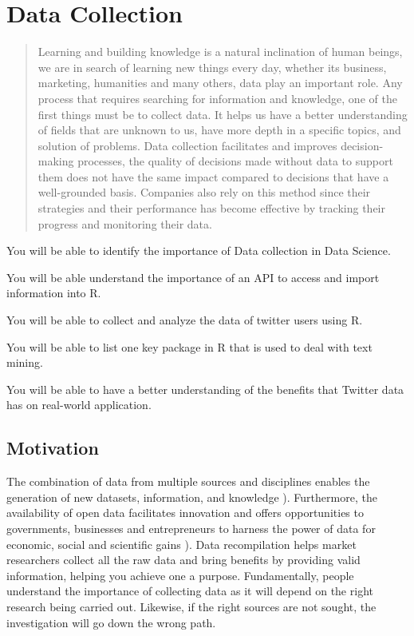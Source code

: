 \chapter{Data Collection}\label{ch:data collection}


\begin{abstract}
	Learning and building knowledge is a natural inclination of human beings, we are in search of learning new things every day, whether its business, marketing, humanities and many others, data play an important role. Any process that requires searching for information and knowledge, one of the first things must be to collect data. It helps us have a better understanding of fields that are unknown to us, have more depth in a specific topics, and solution of problems. Data collection facilitates and improves decision-making processes, the quality of decisions made without data to support them does not have the same impact compared to decisions that have a well-grounded basis. Companies also rely on this method since their strategies and their performance has become effective by tracking their progress and monitoring their data. 
\end{abstract}

\begin{goals}
	\item You will be able to identify the importance of Data collection in Data Science.
	\item You will be able understand the importance of an API to access and import information into R.
	\item You will be able to collect and analyze the data of twitter users using R.
	\item You will be able to list one key package in R that is used to deal with text mining.
	\item You will be able to have a better understanding of the benefits that Twitter data has on real-world application. 
	
\end{goals}

\section{Motivation}
The combination of data from multiple sources and disciplines enables the generation of new datasets, information, and knowledge \citep{JAEGER2010371}). Furthermore, the availability of open data facilitates innovation and offers opportunities to governments, businesses and entrepreneurs to harness the power of data for economic, social and scientiﬁc gains  \citep{SADIQ2017150}).
Data recompilation helps market researchers collect all the raw data and bring benefits by providing valid information, helping you achieve one a purpose. Fundamentally, people understand the importance of collecting data as it will depend on the right research being carried out. Likewise, if the right sources are not sought, the investigation will go down the wrong path.

